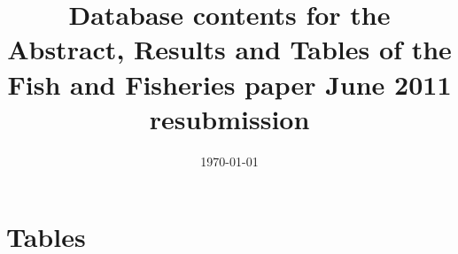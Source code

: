 \documentclass[letterpaper,review,authoryear,12pt]{myelsarticle}
\begin{document}
\begin{frontmatter}
\title{Database contents for the Abstract, Results and Tables of the Fish and Fisheries paper June 2011 resubmission}
\date{\today}
\end{frontmatter}




%
%

\section*{Tables}

\begin{tiny}

\end{tiny}
\end{document}
